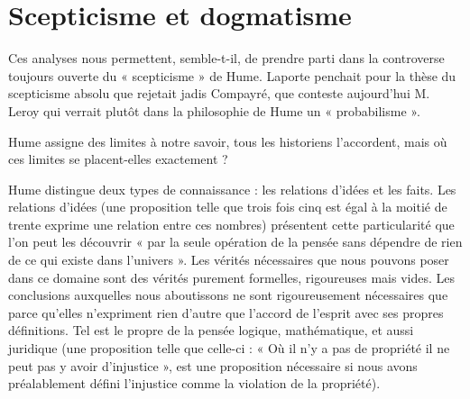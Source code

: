 
\section{Scepticisme et dogmatisme}
Ces analyses nous permettent, semble-t-il, de prendre
parti dans la controverse toujours ouverte du « scepticisme » 
de Hume. Laporte penchait pour la thèse du
scepticisme absolu que rejetait jadis Compayré, que
conteste aujourd’hui M. Leroy qui verrait plutôt dans la
philosophie de Hume un « probabilisme ».

Hume assigne des limites à notre savoir, tous les historiens 
l’accordent, mais où ces limites se placent-elles
exactement ?

Hume distingue deux types de connaissance : les relations 
d’idées et les faits. Les relations d’idées (une proposition 
telle que trois fois cinq est égal à la moitié de trente
exprime une relation entre ces nombres) présentent cette
particularité que l’on peut les découvrir « par la seule
opération de la pensée sans dépendre de rien de ce qui
existe dans l’univers ». Les vérités nécessaires que nous
pouvons poser dans ce domaine sont des vérités purement
formelles, rigoureuses mais vides. Les conclusions auxquelles 
nous aboutissons ne sont rigoureusement nécessaires 
que parce qu’elles n’expriment rien d’autre que
l'accord de l'esprit avec ses propres définitions. Tel est
le propre de la pensée logique, mathématique, et aussi
juridique (une proposition telle que celle-ci : « Où il n’y
a pas de propriété il ne peut pas y avoir d’injustice »,
est une proposition nécessaire si nous avons préalablement
défini l'injustice comme la violation de la propriété).

